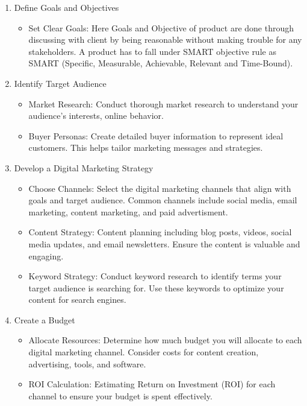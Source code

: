 \begin{enumerate}
    \item Define Goals and Objectives
    \begin{itemize}
        \item Set Clear Goals: Here Goals and Objective of product are done through discussing with client by being reasonable without making trouble for any stakeholders. A product has to fall under SMART objective rule as SMART (Specific, Measurable, Achievable, Relevant and Time-Bound).
    \end{itemize}

    \item Identify Target Audience
        \begin{itemize}
        \item Market Research: Conduct thorough market research to understand your audience's  interests, online behavior.
        \item Buyer Personas: Create detailed buyer information to represent ideal customers. This helps tailor marketing messages and strategies.
    \end{itemize}

     \item Develop a Digital Marketing Strategy
     \begin{itemize}
         \item Choose Channels: Select the digital marketing channels that align with goals and target audience. Common channels include social media, email marketing, content marketing, and paid advertisment.
         \item Content Strategy: Content planning including blog posts, videos, social media updates, and email newsletters. Ensure the content is valuable and engaging.
         \item Keyword Strategy: Conduct keyword research to identify terms your target audience is searching for. Use these keywords to optimize your content for search engines.
     \end{itemize}

    \item Create a Budget
    \begin{itemize}
        \item Allocate Resources: Determine how much budget you will allocate to each digital marketing channel. Consider costs for content creation, advertising, tools, and software.
        \item ROI Calculation: Estimating Return on Investment (ROI) for each channel to ensure your budget is spent effectively.
    \end{itemize}


\end{enumerate}

